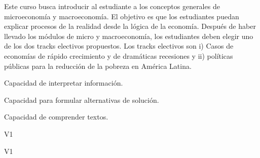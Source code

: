 \begin{syllabus}


\begin{justification}
Este curso busca introducir al estudiante a los conceptos generales de microeconomía y macroeconomía. El objetivo es que los estudiantes puedan explicar procesos de la realidad desde la lógica de la economía. Después de haber llevado los módulos de micro y macroeconomía, los estudiantes deben elegir uno de los dos tracks electivos propuestos.
Los tracks electivos son i) Casos de economías de rápido crecimiento y de dramáticas recesiones y ii) políticas públicas para la reducción de la pobreza en América Latina.
\end{justification}

\begin{goals}
\item Capacidad de interpretar información.
\item Capacidad para formular alternativas de solución.
\item Capacidad de comprender textos.
\end{goals}

\begin{outcomes}{V1}
    \item {} %
    \item {} %
    \item {} %
    \item {} %

\end{outcomes}

\begin{competences}{V1}
    \item {}
    \item {}
    \item {}
    \item {}
\end{competences}


\end{syllabus}
